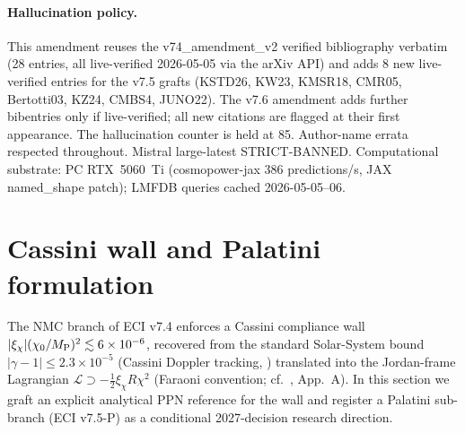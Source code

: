 \documentclass[a4paper,11pt]{article}
\theoremstyle{definition}
\theoremstyle{remark}
\begin{document}
\paragraph{Hallucination policy.}  This amendment reuses the
v74\_amendment\_v2 verified bibliography verbatim (28 entries, all
live-verified 2026-05-05 via the arXiv API) and adds 8 new
live-verified entries for the v7.5 grafts (KSTD26, KW23, KMSR18,
CMR05, Bertotti03, KZ24, CMBS4, JUNO22).  The v7.6 amendment adds
further bibentries only if live-verified; all new citations are
flagged at their first appearance.  The hallucination
counter is held at 85.  Author-name errata respected throughout.
Mistral large-latest STRICT-BANNED.  Computational substrate: PC
RTX~5060~Ti (cosmopower-jax 386 predictions/s, JAX named\_shape
patch); LMFDB queries cached 2026-05-05--06.

\section{Cassini wall and Palatini formulation}
\label{sec:cassini-palatini}

The NMC branch of ECI v7.4 enforces a Cassini compliance wall
$|\xi_\chi|(\chi_0/M_{\rm P})^2 \lesssim 6\times 10^{-6}$, recovered from
the standard Solar-System bound $|\gamma-1|\le 2.3\times 10^{-5}$
(Cassini Doppler tracking, \cite{Bertotti03}) translated into the
Jordan-frame Lagrangian $\mathcal{L}\supset -\tfrac{1}{2}\xi_\chi R\chi^2$
(Faraoni convention; cf.\ \cite{Wolf25}, App.~A).  In this section we
graft an explicit analytical PPN reference for the wall and
register a Palatini sub-branch (ECI v7.5-P) as a conditional
2027-decision research direction.
\end{document}
